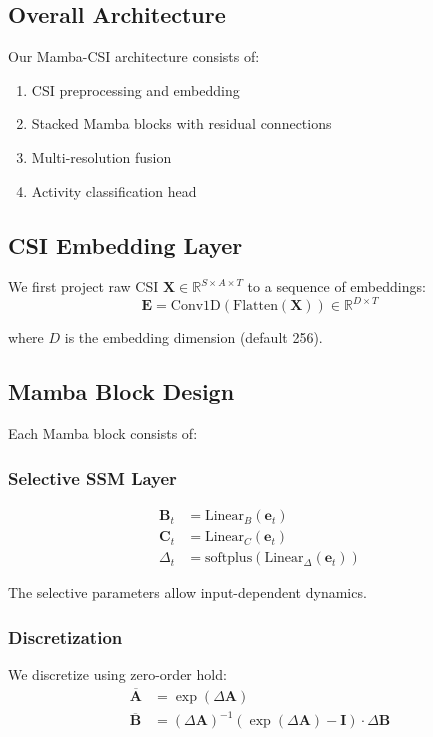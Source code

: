 \documentclass[10pt,conference]{IEEEtran}
\begin{document}
\subsection{Overall Architecture}

Our Mamba-CSI architecture consists of:
\begin{enumerate}
    \item CSI preprocessing and embedding
    \item Stacked Mamba blocks with residual connections
    \item Multi-resolution fusion
    \item Activity classification head
\end{enumerate}

\subsection{CSI Embedding Layer}

We first project raw CSI $\mathbf{X} \in \mathbb{R}^{S \times A \times T}$ to a sequence of embeddings:
\begin{equation}
    \mathbf{E} = \text{Conv1D}(\text{Flatten}(\mathbf{X})) \in \mathbb{R}^{D \times T}
\end{equation}

where $D$ is the embedding dimension (default 256).

\subsection{Mamba Block Design}

Each Mamba block consists of:

\subsubsection{Selective SSM Layer}
\begin{align}
    \mathbf{B}_t &= \text{Linear}_B(\mathbf{e}_t) \\
    \mathbf{C}_t &= \text{Linear}_C(\mathbf{e}_t) \\
    \Delta_t &= \text{softplus}(\text{Linear}_{\Delta}(\mathbf{e}_t))
\end{align}

The selective parameters allow input-dependent dynamics.

\subsubsection{Discretization}
We discretize using zero-order hold:
\begin{align}
    \overline{\mathbf{A}} &= \exp(\Delta \mathbf{A}) \\
    \overline{\mathbf{B}} &= (\Delta \mathbf{A})^{-1}(\exp(\Delta \mathbf{A}) - \mathbf{I}) \cdot \Delta \mathbf{B}
\end{align}
\end{document}
